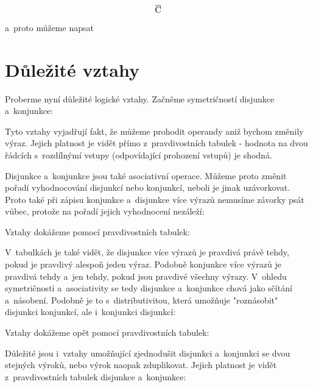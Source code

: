 \begin{equation}
\overline{\mathrm{C}}
\end{equation}

a~proto můžeme napsat


\section{Důležité vztahy}

Proberme nyní důležité logické vztahy. Začněme symetričností disjunkce a~konjunkce:


Tyto vztahy vyjadřují fakt, že můžeme prohodit operandy aniž bychom změnily výraz. Jejich platnost je vidět přímo z~pravdivostních tabulek - hodnota na dvou řádcích s~rozdílnýmí vstupy (odpovídající prohození vstupů) je shodná.

Disjunkce a~konjunkce jsou také asociativní operace. Můžeme proto změnit pořadí vyhodnocování disjunkcí nebo konjunkcí, neboli je jinak uzávorkovat. Proto také při zápisu konjunkce a~disjunkce více výrazů nemusíme závorky psát vůbec, protože na pořadí jejich vyhodnocení nezáleží:


Vztahy dokážeme pomocí pravdivostních tabulek:



V~tabulkách je také vidět, že disjunkce více výrazů je pravdivá právě tehdy, pokud je pravdivý alespoň jeden výraz. Podobně konjunkce více výrazů je pravdivá tehdy a~jen tehdy, pokud jsou pravdivé všechny výrazy. V~ohledu symetričnosti a~asociativity se tedy disjunkce a~konjunkce chová jako sčítání a~násobení. Podobně je to s~distributivitou, která umožňuje "roznásobit" disjunkci konjunkcí, ale i~konjunkci disjunkcí:


Vztahy dokážeme opět pomocí pravdivostních tabulek:



Důležité jsou i~vztahy umožňující zjednodušit disjunkci a~konjunkci se dvou stejných výroků, nebo výrok naopak zduplikovat. Jejich platnost je vidět z~pravdivostních tabulek disjunkce a~konjunkce:

